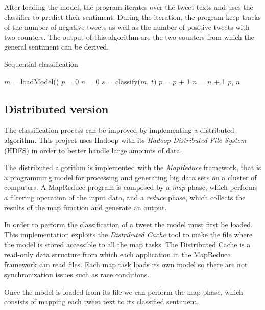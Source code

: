 \documentclass[10pt,twocolumn,letterpaper]{article}
\begin{document}
After loading the model, the program iterates over the tweet texts and uses the classifier to predict their sentiment. During the iteration, the program keep tracks of the number of negative tweets as well as the number of positive tweets with two counters. The output of this algorithm are the two counters from which the general sentiment can be derived.

\begin{algorithm}[H]
\label{SequentialClassification}
\caption{Sequential classification}
\begin{algorithmic}

    \State $m$ = loadModel()
    \State $p$ = 0
    \State $n$ = 0
        \State $s$ = classify($m$, $t$)
            \State $p$ = $p$ + 1
        \Else
            \State $n$ = $n$ + 1
        \EndIf
    \EndFor
    \State \Return $p$, $n$

\end{algorithmic}
\end{algorithm}

\subsection{Distributed version}

The classification process can be improved by implementing a distributed algorithm. This project uses Hadoop with its \textit{Hadoop Distributed File System} (HDFS) in order to better handle large amounts of data.

The distributed algorithm is implemented with the \textit{MapReduce} framework, that is a programming model for processing and generating big data sets on a cluster of computers. A MapReduce program is composed by a \textit{map} phase, which performs a filtering operation of the input data, and a \textit{reduce} phase, which collects the results of the map function and generate an output.

In order to perform the classification of a tweet the model must first be loaded. This implementation exploits the \textit{Distributed Cache} tool to make the file where the model is stored accessible to all the map tasks. The Distributed Cache is a read-only data structure from which each application in the MapReduce framework can read files. Each map task loads its own model so there are not synchronization issues such as race conditions.

Once the model is loaded from its file we can perform the map phase, which consists of mapping each tweet text to its classified sentiment.
\end{document}
